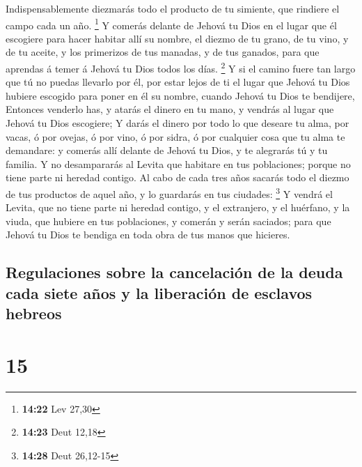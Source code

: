  Indispensablemente diezmarás todo el producto de tu
simiente, que rindiere el campo cada un año. \footnote{\textbf{14:22}
  Lev 27,30}  Y comerás delante de Jehová tu Dios en el
lugar que él escogiere para hacer habitar allí su nombre, el diezmo de
tu grano, de tu vino, y de tu aceite, y los primerizos de tus manadas, y
de tus ganados, para que aprendas á temer á Jehová tu Dios todos los
días. \footnote{\textbf{14:23} Deut 12,18}  Y si el
camino fuere tan largo que tú no puedas llevarlo por él, por estar lejos
de ti el lugar que Jehová tu Dios hubiere escogido para poner en él su
nombre, cuando Jehová tu Dios te bendijere,  Entonces
venderlo has, y atarás el dinero en tu mano, y vendrás al lugar que
Jehová tu Dios escogiere;  Y darás el dinero por todo lo
que deseare tu alma, por vacas, ó por ovejas, ó por vino, ó por sidra, ó
por cualquier cosa que tu alma te demandare: y comerás allí delante de
Jehová tu Dios, y te alegrarás tú y tu familia.  Y no
desampararás al Levita que habitare en tus poblaciones; porque no tiene
parte ni heredad contigo.  Al cabo de cada tres años
sacarás todo el diezmo de tus productos de aquel año, y lo guardarás en
tus ciudades: \footnote{\textbf{14:28} Deut 26,12-15}  Y
vendrá el Levita, que no tiene parte ni heredad contigo, y el
extranjero, y el huérfano, y la viuda, que hubiere en tus poblaciones, y
comerán y serán saciados; para que Jehová tu Dios te bendiga en toda
obra de tus manos que hicieres.

\hypertarget{regulaciones-sobre-la-cancelaciuxf3n-de-la-deuda-cada-siete-auxf1os-y-la-liberaciuxf3n-de-esclavos-hebreos}{%
\subsection{Regulaciones sobre la cancelación de la deuda cada siete
años y la liberación de esclavos
hebreos}\label{regulaciones-sobre-la-cancelaciuxf3n-de-la-deuda-cada-siete-auxf1os-y-la-liberaciuxf3n-de-esclavos-hebreos}}

\hypertarget{section-14}{%
\section{15}\label{section-14}}

